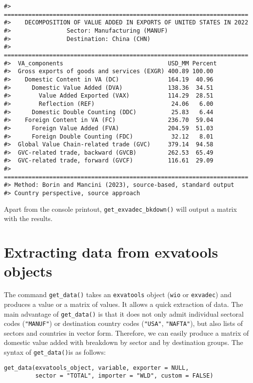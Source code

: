 \begin{verbatim}
#> ======================================================================
#>    DECOMPOSITION OF VALUE ADDED IN EXPORTS OF UNITED STATES IN 2022
#>                Sector: Manufacturing (MANUF)
#>                Destination: China (CHN)
#> ======================================================================
#>  VA_components                              USD_MM Percent
#>  Gross exports of goods and services (EXGR) 400.89 100.00 
#>    Domestic Content in VA (DC)              164.19  40.96 
#>      Domestic Value Added (DVA)             138.36  34.51 
#>        Value Added Exported (VAX)           114.29  28.51 
#>        Reflection (REF)                      24.06   6.00 
#>      Domestic Double Counting (DDC)          25.83   6.44 
#>    Foreign Content in VA (FC)               236.70  59.04 
#>      Foreign Value Added (FVA)              204.59  51.03 
#>      Foreign Double Counting (FDC)           32.12   8.01 
#>  Global Value Chain-related trade (GVC)     379.14  94.58 
#>  GVC-related trade, backward (GVCB)         262.53  65.49 
#>  GVC-related trade, forward (GVCF)          116.61  29.09 
#> ======================================================================
#> Method: Borin and Mancini (2023), source-based, standard output
#> Country perspective, source approach
\end{verbatim}

Apart from the console printout, \texttt{get\_exvadec\_bkdown()} will output a
matrix with the results.

\hypertarget{extracting-data-from-exvatools-objects}{%
\section{Extracting data from exvatools objects}\label{extracting-data-from-exvatools-objects}}

The command \texttt{get\_data()} takes an \texttt{exvatools} object (\texttt{wio} or
\texttt{exvadec}) and produces a value or a matrix of values. It allows a quick
extraction of data. The main advantage of \texttt{get\_data()} is that it does not
only admit individual sectoral codes (\texttt{"MANUF"}) or destination country
codes (\texttt{"USA"}, \texttt{"NAFTA"}), but also lists of sectors and countries
in vector form. Therefore, we can easily produce a matrix of domestic value
added with breakdown by sector and by destination groups. The syntax of
\texttt{get\_data()}is as follows:

\begin{verbatim}
get_data(exvatools_object, variable, exporter = NULL,
         sector = "TOTAL", importer = "WLD", custom = FALSE)
\end{verbatim}

